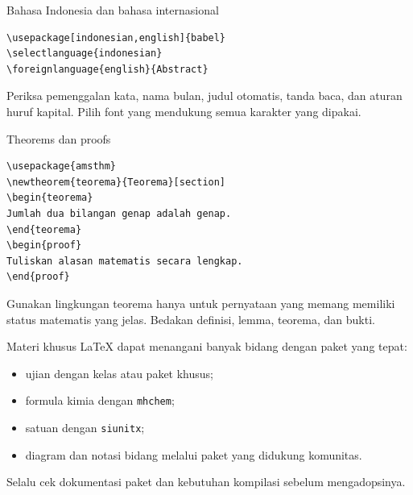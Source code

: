 \documentclass[aspectratio=169,11pt]{beamer}
\begin{document}
\begin{frame}[fragile]{Bahasa Indonesia dan bahasa internasional}
\begin{lstlisting}
\usepackage[indonesian,english]{babel}
\selectlanguage{indonesian}
\foreignlanguage{english}{Abstract}
\end{lstlisting}
Periksa pemenggalan kata, nama bulan, judul otomatis, tanda baca, dan
aturan huruf kapital. Pilih font yang mendukung semua karakter yang dipakai.
\end{frame}
\begin{frame}[fragile]{Theorems dan proofs}
\begin{lstlisting}
\usepackage{amsthm}
\newtheorem{teorema}{Teorema}[section]
\begin{teorema}
Jumlah dua bilangan genap adalah genap.
\end{teorema}
\begin{proof}
Tuliskan alasan matematis secara lengkap.
\end{proof}
\end{lstlisting}
Gunakan lingkungan teorema hanya untuk pernyataan yang memang memiliki
status matematis yang jelas. Bedakan definisi, lemma, teorema, dan bukti.
\end{frame}
\begin{frame}{Materi khusus}
LaTeX dapat menangani banyak bidang dengan paket yang tepat:
\begin{itemize}
\item ujian dengan kelas atau paket khusus;
\item formula kimia dengan \texttt{mhchem};
\item satuan dengan \texttt{siunitx};
\item diagram dan notasi bidang melalui paket yang didukung komunitas.
\end{itemize}
Selalu cek dokumentasi paket dan kebutuhan kompilasi sebelum mengadopsinya.
\end{frame}
\end{document}
